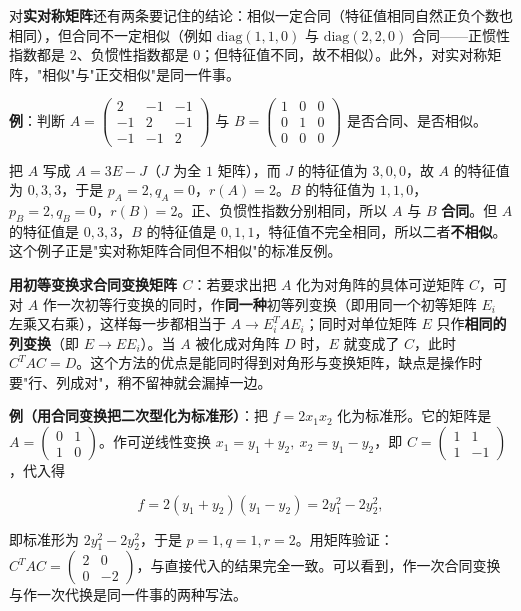 \documentclass[11pt,openany,UTF8]{ctexbook}
\begin{document}
对\textbf{实对称矩阵}还有两条要记住的结论：相似一定合同（特征值相同自然正负个数也相同），但合同不一定相似（例如 $\mathrm{diag}(1,1,0)$ 与 $\mathrm{diag}(2,2,0)$ 合同——正惯性指数都是 $2$、负惯性指数都是 $0$；但特征值不同，故不相似）。此外，对实对称矩阵，"相似"与"正交相似"是同一件事。

\textbf{例}：判断 $A=\begin{pmatrix}2&-1&-1\\-1&2&-1\\-1&-1&2\end{pmatrix}$ 与 $B=\begin{pmatrix}1&0&0\\0&1&0\\0&0&0\end{pmatrix}$ 是否合同、是否相似。

把 $A$ 写成 $A=3E-J$（$J$ 为全 $1$ 矩阵），而 $J$ 的特征值为 $3,0,0$，故 $A$ 的特征值为 $0,3,3$，于是 $p_A=2,q_A=0$，$r(A)=2$。$B$ 的特征值为 $1,1,0$，$p_B=2,q_B=0$，$r(B)=2$。正、负惯性指数分别相同，所以 $A$ 与 $B$ \textbf{合同}。但 $A$ 的特征值是 $0,3,3$，$B$ 的特征值是 $0,1,1$，特征值不完全相同，所以二者\textbf{不相似}。这个例子正是"实对称矩阵合同但不相似"的标准反例。

\textbf{用初等变换求合同变换矩阵 $C$}：若要求出把 $A$ 化为对角阵的具体可逆矩阵 $C$，可对 $A$ 作一次初等行变换的同时，作\textbf{同一种}初等列变换（即用同一个初等矩阵 $E_i$ 左乘又右乘），这样每一步都相当于 $A\to E_i^TAE_i$；同时对单位矩阵 $E$ 只作\textbf{相同的列变换}（即 $E\to EE_i$）。当 $A$ 被化成对角阵 $D$ 时，$E$ 就变成了 $C$，此时 $C^TAC=D$。这个方法的优点是能同时得到对角形与变换矩阵，缺点是操作时要"行、列成对"，稍不留神就会漏掉一边。

\textbf{例（用合同变换把二次型化为标准形）}：把 $f=2x_1x_2$ 化为标准形。它的矩阵是 $A=\begin{pmatrix}0&1\\1&0\end{pmatrix}$。作可逆线性变换 $x_1=y_1+y_2,\ x_2=y_1-y_2$，即 $C=\begin{pmatrix}1&1\\1&-1\end{pmatrix}$，代入得

\[f=2(y_1+y_2)(y_1-y_2)=2y_1^2-2y_2^2,\]

即标准形为 $2y_1^2-2y_2^2$，于是 $p=1,q=1,r=2$。用矩阵验证：$C^TAC=\begin{pmatrix}2&0\\0&-2\end{pmatrix}$，与直接代入的结果完全一致。可以看到，作一次合同变换与作一次代换是同一件事的两种写法。
\end{document}

